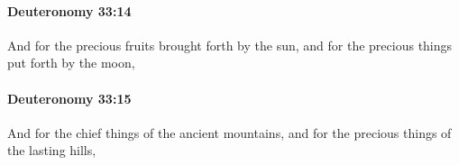 		\paragraph{Deuteronomy 33:14} %
			\label{DEUTERONOMY-33-14}

			And for the precious fruits brought forth by the sun, and for the precious things put forth by the moon,


		\paragraph{Deuteronomy 33:15} %
			\label{DEUTERONOMY-33-15}

			And for the chief things of the ancient mountains, and for the precious things of the lasting hills,



